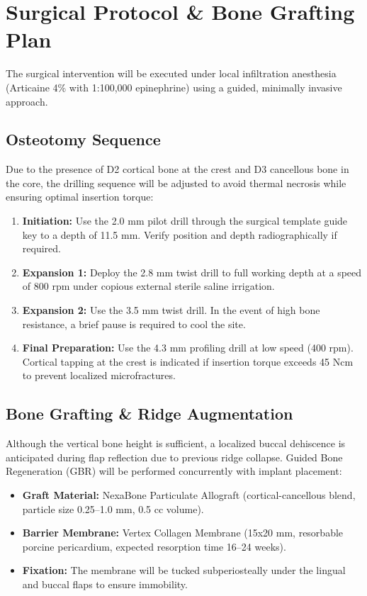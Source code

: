 \section{Surgical Protocol \& Bone Grafting Plan}

The surgical intervention will be executed under local infiltration anesthesia (Articaine 4\% with 1:100,000 epinephrine) using a guided, minimally invasive approach.

\subsection{Osteotomy Sequence}
Due to the presence of D2 cortical bone at the crest and D3 cancellous bone in the core, the drilling sequence will be adjusted to avoid thermal necrosis while ensuring optimal insertion torque:
\begin{enumerate}
    \item \textbf{Initiation:} Use the 2.0 mm pilot drill through the surgical template guide key to a depth of 11.5 mm. Verify position and depth radiographically if required.
    \item \textbf{Expansion 1:} Deploy the 2.8 mm twist drill to full working depth at a speed of 800 rpm under copious external sterile saline irrigation.
    \item \textbf{Expansion 2:} Use the 3.5 mm twist drill. In the event of high bone resistance, a brief pause is required to cool the site.
    \item \textbf{Final Preparation:} Use the 4.3 mm profiling drill at low speed (400 rpm). Cortical tapping at the crest is indicated if insertion torque exceeds 45 Ncm to prevent localized microfractures.
\end{enumerate}

\subsection{Bone Grafting \& Ridge Augmentation}
Although the vertical bone height is sufficient, a localized buccal dehiscence is anticipated during flap reflection due to previous ridge collapse. Guided Bone Regeneration (GBR) will be performed concurrently with implant placement:
\begin{itemize}
    \item \textbf{Graft Material:} NexaBone Particulate Allograft (cortical-cancellous blend, particle size 0.25--1.0 mm, 0.5 cc volume).
    \item \textbf{Barrier Membrane:} Vertex Collagen Membrane (15x20 mm, resorbable porcine pericardium, expected resorption time 16--24 weeks).
    \item \textbf{Fixation:} The membrane will be tucked subperiosteally under the lingual and buccal flaps to ensure immobility.
\end{itemize}

